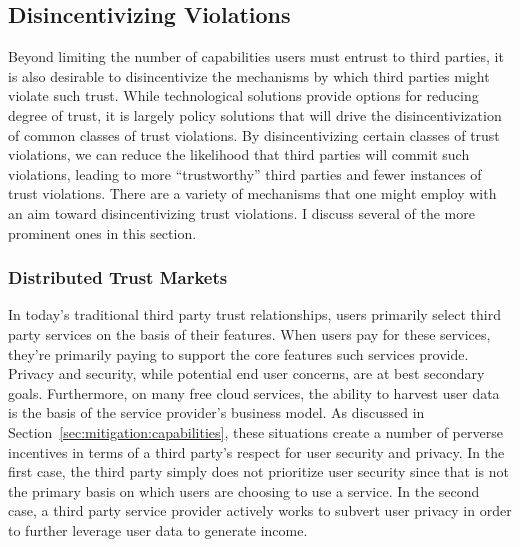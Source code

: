 \subsection{Disincentivizing Violations}
\label{sec:mitigation:violations}

Beyond limiting the number of capabilities users must entrust to third
parties, it is also desirable to disincentivize the mechanisms by
which third parties might violate such trust.  While technological
solutions provide options for reducing degree of trust, it is largely
policy solutions that will drive the disincentivization of common
classes of trust violations. By disincentivizing certain classes of
trust violations, we can reduce the likelihood that third parties will
commit such violations, leading to more ``trustworthy'' third parties
and fewer instances of trust violations. There are a variety of
mechanisms that one might employ with an aim toward disincentivizing
trust violations. I discuss several of the more prominent ones in this
section.

\subsubsection{Distributed Trust Markets}

In today's traditional third party trust relationships, users
primarily select third party services on the basis of their
features. When users pay for these services, they're primarily paying
to support the core features such services provide. Privacy and
security, while potential end user concerns, are at best secondary
goals. Furthermore, on many free cloud services, the ability to
harvest user data is the basis of the service provider's business
model. As discussed in Section~\ref{sec:mitigation:capabilities},
these situations create a number of perverse incentives in terms of a
third party's respect for user security and privacy. In the first
case, the third party simply does not prioritize user security since
that is not the primary basis on which users are choosing to use a
service. In the second case, a third party service provider actively
works to subvert user privacy in order to further leverage user data
to generate income.

